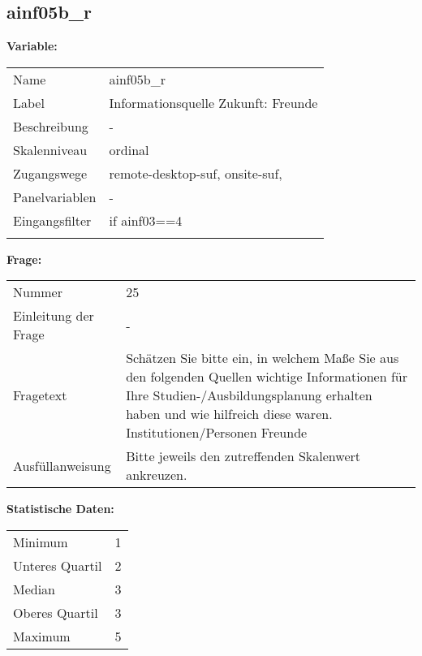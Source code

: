 	
	
	\subsection{ainf05b\_r}
	\label{subSection:ainf05b_r}

	\noindent\textbf{Variable:}\\
		\begin{tabular}{lL{11.3cm}}
			\label{tableVariable:ainf05b_r}
			Name & ainf05b\_r \\
			Label & Informationsquelle Zukunft: Freunde \\
			Beschreibung & - \\
			Skalenniveau & ordinal \\
			Zugangswege &
				remote-desktop-suf,
				onsite-suf,
 \\
			Panelvariablen & -
			 \\
			Eingangsfilter & if ainf03==4 \\
 \\
		\end{tabular}

		\vspace*{1 cm}
		\noindent\textbf{Frage:}\\
		\begin{tabular}{lL{11.3cm}}
			\label{tableQuestion:ainf05b_r}
			Nummer & 25 \\
			Einleitung der Frage & - \\
			Fragetext & Schätzen Sie bitte ein, in welchem Maße Sie aus den folgenden Quellen wichtige Informationen für Ihre Studien-/Ausbildungsplanung erhalten haben und wie hilfreich diese waren.
Institutionen/Personen
Freunde \\
			Ausfüllanweisung & Bitte jeweils den zutreffenden Skalenwert ankreuzen. \\
		\end{tabular}


		\vspace*{1 cm}
		\noindent\textbf{Statistische Daten:}\\
			\begin{tabular}{ll}
				\label{tableStatistics:ainf05b_r}
					Minimum & 1 \\
					Unteres Quartil & 2 \\
					Median & 3 \\
					Oberes Quartil & 3 \\
					Maximum & 5 \\
			\end{tabular}



